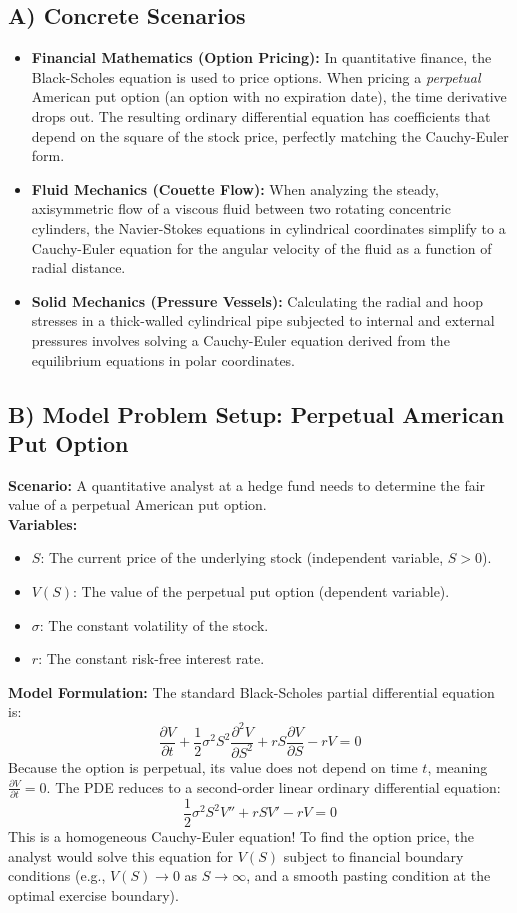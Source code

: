 \documentclass{article}
\begin{document}
\subsection{A) Concrete Scenarios}
\begin{itemize}
    \item \textbf{Financial Mathematics (Option Pricing):} In quantitative finance, the Black-Scholes equation is used to price options. When pricing a \textit{perpetual} American put option (an option with no expiration date), the time derivative drops out. The resulting ordinary differential equation has coefficients that depend on the square of the stock price, perfectly matching the Cauchy-Euler form.
    \item \textbf{Fluid Mechanics (Couette Flow):} When analyzing the steady, axisymmetric flow of a viscous fluid between two rotating concentric cylinders, the Navier-Stokes equations in cylindrical coordinates simplify to a Cauchy-Euler equation for the angular velocity of the fluid as a function of radial distance.
    \item \textbf{Solid Mechanics (Pressure Vessels):} Calculating the radial and hoop stresses in a thick-walled cylindrical pipe subjected to internal and external pressures involves solving a Cauchy-Euler equation derived from the equilibrium equations in polar coordinates.
\end{itemize}

\subsection{B) Model Problem Setup: Perpetual American Put Option}
\textbf{Scenario:} A quantitative analyst at a hedge fund needs to determine the fair value of a perpetual American put option. \\
\textbf{Variables:}
\begin{itemize}
    \item $S$: The current price of the underlying stock (independent variable, $S > 0$).
    \item $V(S)$: The value of the perpetual put option (dependent variable).
    \item $\sigma$: The constant volatility of the stock.
    \item $r$: The constant risk-free interest rate.
\end{itemize}
\textbf{Model Formulation:}
The standard Black-Scholes partial differential equation is:
\[ \frac{\partial V}{\partial t} + \frac{1}{2}\sigma^2 S^2 \frac{\partial^2 V}{\partial S^2} + r S \frac{\partial V}{\partial S} - rV = 0 \]
Because the option is perpetual, its value does not depend on time $t$, meaning $\frac{\partial V}{\partial t} = 0$. The PDE reduces to a second-order linear ordinary differential equation:
\[ \frac{1}{2}\sigma^2 S^2 V'' + r S V' - rV = 0 \]
This is a homogeneous Cauchy-Euler equation! To find the option price, the analyst would solve this equation for $V(S)$ subject to financial boundary conditions (e.g., $V(S) \to 0$ as $S \to \infty$, and a smooth pasting condition at the optimal exercise boundary).
\end{document}
